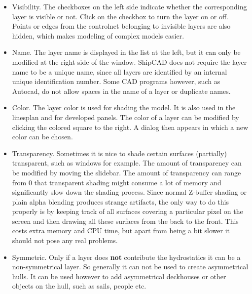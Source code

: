 \documentclass[12pt]{article}
\begin{document}
\begin{itemize}

\item Visibility.
The checkboxes on the left side indicate whether the corresponding
layer is visible or not. Click on the checkbox to turn the layer on or
off. Points or edges from the controlnet belonging to invisible layers
are also hidden, which makes modeling of complex models easier.

\item Name.
The layer name is displayed in the list at the left, but it can only
be modified at the right side of the window. ShipCAD does not require
the layer name to be a unique name, since all layers are identified by
an internal unique identification number. Some CAD programs however,
such as Autocad, do not allow spaces in the name of a layer or
duplicate names.

\item Color.
The layer color is used for shading the model. It is also used in the
linesplan and for developed panels. The color of a layer can be
modified by clicking the colored square to the right. A dialog then
appears in which a new color can be chosen.

\item Transparency.
Sometimes it is nice to shade certain surfaces (partially)
transparent, such as windows for example. The amount of transparency
can be modified by moving the slidebar.  The amount of transparency
can range from 0%
that transparent shading might consume a lot of memory and
significantly slow down the shading process. Since normal Z-buffer
shading or plain alpha blending produces strange artifacts, the only
way to do this properly is by keeping track of all surfaces covering a
particular pixel on the screen and then drawing all these surfaces
from the back to the front. This costs extra memory and CPU time, but
apart from being a bit slower it should not pose any real problems.

\item Symmetric.
Only if a layer does \textbf{not} contribute the hydrostatics it can be a
non-symmetrical layer. So generally it can not be used to create
asymmetrical hulls. It can be used however to add asymmetrical
deckhouses or other objects on the hull, such as sails, people etc.


\end{itemize}
\end{document}
